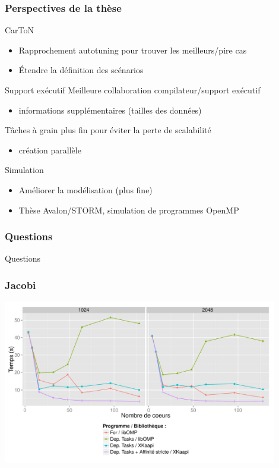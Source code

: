 \documentclass[xcolor={usenames,dvipsnames,svgnames,table}, aspectratio=43]{beamer}
\begin{document}
\begin{frame}
  \frametitle{Perspectives de la thèse}
  \begin{block}{CarToN}
    \begin{itemize}
      \item Rapprochement autotuning pour trouver les meilleurs/pire cas
      \item Étendre la définition des scénarios
    \end{itemize}
  \end{block}

  \begin{block}{Support exécutif}
    Meilleure collaboration compilateur/support exécutif
    \begin{itemize}
      \item informations supplémentaires (tailles des données)
    \end{itemize}
    Tâches à grain plus fin pour éviter la perte de scalabilité
    \begin{itemize}
      \item création parallèle
    \end{itemize}
  \end{block}

  \begin{block}{Simulation}
    \begin{itemize}
      \item Améliorer la modélisation (plus fine)
      \item Thèse Avalon/STORM, simulation de programmes OpenMP
    \end{itemize}
  \end{block}
\end{frame}

\begin{frame}
  \frametitle{Questions}

  Questions

\end{frame}

\begin{frame}
  \frametitle{Jacobi}

  \includegraphics[width=0.9\textwidth]{graph/jacobi_scale_iomp_komp.pdf}

\end{frame}
\end{document}
